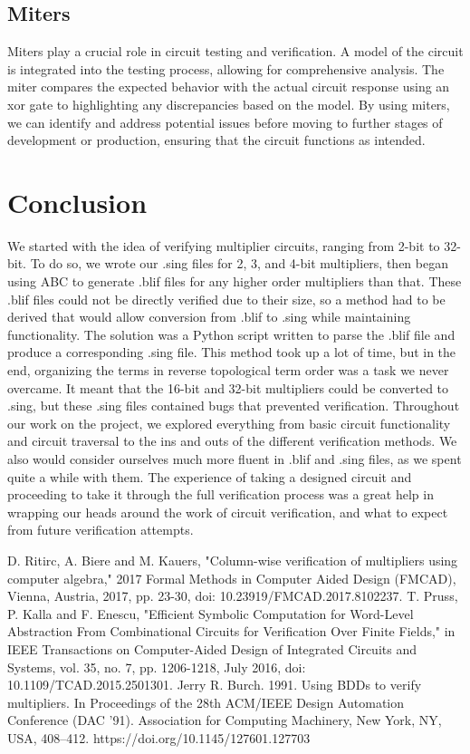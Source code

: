 \documentclass[conference]{IEEEtran}
\begin{document}
\subsection{Miters}
Miters play a crucial role in circuit testing and verification. A model of the circuit is integrated into 
the testing process, allowing for comprehensive analysis. The miter compares the expected behavior with 
the actual circuit response using an xor gate to highlighting any discrepancies based on the model. 
By using miters, we can identify and address potential issues before moving to further stages of development 
or production, ensuring that the circuit functions as intended.  

\section{Conclusion}
We started with the idea of verifying multiplier circuits, ranging from 2-bit to
32-bit. To do so, we wrote our .sing files for 2, 3, and 4-bit multipliers, then 
began using ABC to generate .blif files for any higher order multipliers than that. These 
.blif files could not be directly verified due to their size, so a method had to be derived 
that would allow conversion from .blif to .sing while maintaining functionality. The solution 
was a Python script written to parse the .blif file and produce a corresponding .sing file. 
This method took up a lot of time, but in the end, organizing the terms in reverse topological term order was a 
task we never overcame. It meant that the 16-bit and 32-bit multipliers could be converted to .sing, but these .sing files contained bugs that 
prevented verification. Throughout our work on the project, we explored everything from basic 
circuit functionality and circuit traversal to the ins and outs of the different
verification methods. We also would consider ourselves much more fluent in .blif and .sing files, as 
we spent quite a while with them. The experience of taking a designed circuit and proceeding to 
take it through the full verification process was a great help in wrapping our heads around 
the work of circuit verification, and what to expect from future verification attempts.
 
\begin{thebibliography}{03}
 D. Ritirc, A. Biere and M. Kauers, "Column-wise verification of multipliers using computer algebra," 2017 Formal Methods in Computer Aided Design (FMCAD), Vienna, Austria, 2017, pp. 23-30, doi: 10.23919/FMCAD.2017.8102237.
 T. Pruss, P. Kalla and F. Enescu, "Efficient Symbolic Computation for Word-Level Abstraction From Combinational Circuits for Verification Over Finite Fields," in IEEE Transactions on Computer-Aided Design of Integrated Circuits and Systems, vol. 35, no. 7, pp. 1206-1218, July 2016, doi: 10.1109/TCAD.2015.2501301.
 Jerry R. Burch. 1991. Using BDDs to verify multipliers. In Proceedings of the 28th ACM/IEEE Design Automation Conference (DAC '91). Association for Computing Machinery, New York, NY, USA, 408–412. https://doi.org/10.1145/127601.127703
\end{thebibliography}
\vspace{12pt}
\end{document}
